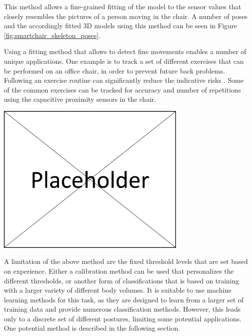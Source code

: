 This method allows a fine-grained fitting of the model to the sensor values that closely resembles the pictures of a person moving in the chair. A number of poses and the accordingly fitted 3D models using this method can be seen in Figure \ref{fig:smartchair_skeleton_poses}.

Using a fitting method that allows to detect fine movements enables a number of unique applications. One example is to track a set of different exercises that can be performed on an office chair, in order to prevent future back problems. Following an exercise routine can significantly reduce the indicative risks \cite{robertson2009effects}. Some of the common exercises can be tracked for accuracy and number of repetitions using the capacitive proximity sensors in the chair.

\begin{minipage}{\linewidth}
\centering
\includegraphics[width=0.7\textwidth]{images/placeholder}
\label{fig:smartchair_skeleton_poses}
\end{minipage}

A limitation of the above method are the fixed threshold levels that are set based on experience. Either a calibration method can be used that personalizes the different thresholds, or another form of classifications that is based on training with a larger variety of different body volumes. It is suitable to use machine learning methods for this task, as they are designed to learn from a larger set of training data and provide numerous classification methods. However, this leads only to a discrete set of different postures, limiting some potential applications. One potential method is described in the following section.

